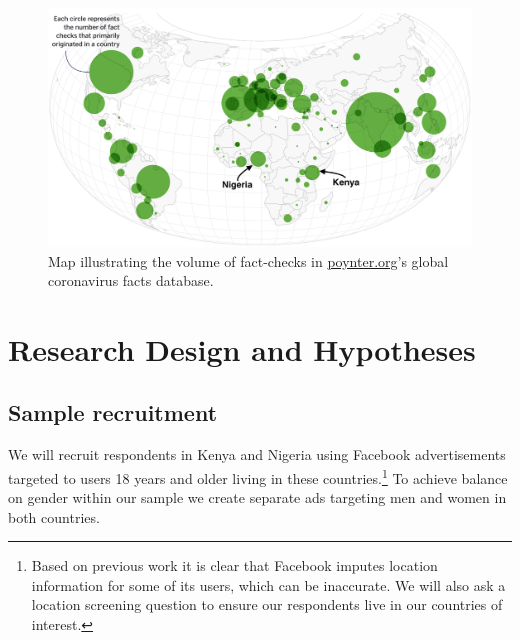 \documentclass[letterpaper, 12pt, parskip=full,DIV=12]{scrartcl}
\begin{document}

\begin{figure}[htb]
\centering
\caption{Map illustrating the volume of fact-checks in \url{poynter.org}'s global coronavirus facts database.}
\label{fig:poynter}
\includegraphics[width=.95\textwidth]{poynter2.png}
\end{figure}


\section{Research Design and Hypotheses}



\subsection{Sample recruitment}
We will recruit respondents in Kenya and Nigeria using Facebook advertisements targeted to users 18 years and older living in these countries.\footnote{Based on previous work it is clear that Facebook imputes location information for some of its users, which can be inaccurate. We will also ask a location screening question to ensure our respondents live in our countries of interest.} To achieve balance on gender within our sample we create separate ads targeting men and women in both countries. 

\end{document}
